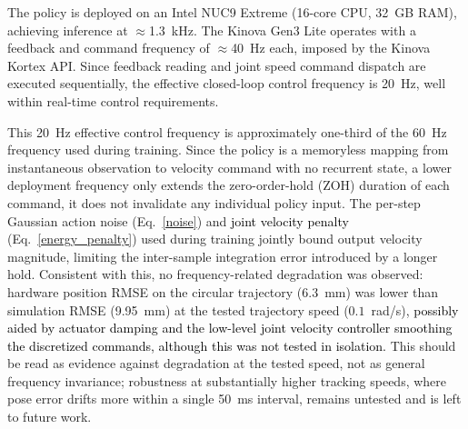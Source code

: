 \documentclass[preprint,12pt]{elsarticle}
\begin{document}
The policy is deployed on an Intel NUC9 Extreme (16-core CPU, 32~GB RAM), achieving inference at $\approx$1.3~kHz. The Kinova Gen3 Lite operates with a feedback and command frequency of $\approx$40~Hz each, imposed by the Kinova Kortex API. Since feedback reading and joint speed command dispatch are executed sequentially, the effective closed-loop control frequency is 20~Hz, well within real-time control requirements.

This 20~Hz effective control frequency is approximately one-third of the
60~Hz frequency used during training. Since the policy is a memoryless
mapping from instantaneous observation to velocity command with no
recurrent state, a lower deployment frequency only extends the
zero-order-hold (ZOH) duration of each command, it does not invalidate
any individual policy input. The per-step Gaussian action noise (Eq.~\eqref{noise}) and \textcolor{black}{joint velocity penalty} (Eq.~\eqref{energy_penalty}) used during training jointly bound output velocity magnitude, limiting the inter-sample integration error introduced by a longer hold. Consistent with this, no frequency-related degradation was observed: hardware position RMSE on the circular trajectory (6.3~mm) was lower than simulation RMSE (9.95~mm) at the tested trajectory speed ($0.1$~rad/s), \textcolor{black}{possibly aided by actuator damping and the low-level joint velocity controller smoothing the discretized commands, although this was not tested in isolation.} This should be read as evidence against degradation at the tested speed, not as general frequency invariance; robustness at substantially higher tracking speeds, where pose error drifts more within a single 50~ms interval, remains untested and is left to future work.
\end{document}
